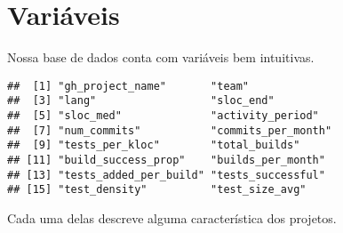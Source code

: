 \documentclass[]{article}
\newenvironment{Shaded}{\begin{snugshade}}{\end{snugshade}}
\newcommand{\KeywordTok}[1]{\textcolor[rgb]{0.13,0.29,0.53}{\textbf{#1}}}
\newcommand{\StringTok}[1]{\textcolor[rgb]{0.31,0.60,0.02}{#1}}
\newcommand{\OperatorTok}[1]{\textcolor[rgb]{0.81,0.36,0.00}{\textbf{#1}}}
\newcommand{\NormalTok}[1]{#1}
\begin{document}
\section{Variáveis}\label{variaveis}

Nossa base de dados conta com variáveis bem intuitivas.

\begin{Shaded}
\end{Shaded}

\begin{verbatim}
##  [1] "gh_project_name"       "team"                 
##  [3] "lang"                  "sloc_end"             
##  [5] "sloc_med"              "activity_period"      
##  [7] "num_commits"           "commits_per_month"    
##  [9] "tests_per_kloc"        "total_builds"         
## [11] "build_success_prop"    "builds_per_month"     
## [13] "tests_added_per_build" "tests_successful"     
## [15] "test_density"          "test_size_avg"
\end{verbatim}

Cada uma delas descreve alguma característica dos projetos.
\end{document}
